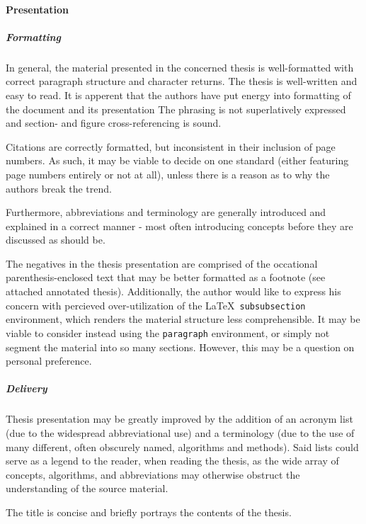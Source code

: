 
\paragraph{Presentation}
\label{par:presentation}

\subparagraph{Formatting}
\label{par:formatting}
In general, the material presented in the concerned thesis is well-formatted with correct paragraph structure and character returns.
The thesis is well-written and easy to read.
It is apperent that the authors have put energy into formatting of the document and its presentation
The phrasing is not superlatively expressed and section- and figure cross-referencing is sound.

Citations are correctly formatted, but inconsistent in their inclusion of page numbers.
As such, it may be viable to decide on one standard (either featuring page numbers entirely or not at all), unless there is a reason as to why the authors break the trend.

Furthermore, abbreviations and terminology are generally introduced and explained in a correct manner - most often introducing concepts before they are discussed as should be.

The negatives in the thesis presentation are comprised of the occational parenthesis-enclosed text that may be better formatted as a footnote (see attached annotated thesis).
Additionally, the author would like to express his concern with percieved over-utilization of the \LaTeX\ \texttt{subsubsection} environment, which renders the material structure less comprehensible.
It may be viable to consider instead using the \texttt{paragraph} environment, or simply not segment the material into so many sections.
However, this may be a question on personal preference.

\subparagraph{Delivery}
\label{par:presentation_delivery}
Thesis presentation may be greatly improved by the addition of an acronym list (due to the widespread abbreviational use) and a terminology (due to the use of many different, often obscurely named, algorithms and methods).
Said lists could serve as a legend to the reader, when reading the thesis, as the wide array of concepts, algorithms, and abbreviations may otherwise obstruct the understanding of the source material.

The title is concise and briefly portrays the contents of the thesis.